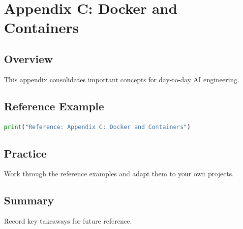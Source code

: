 \chapter{Appendix C: Docker and Containers}
\label{chap:vol12-3}



\section{Overview}
This appendix consolidates important concepts for day-to-day AI engineering.

\section{Reference Example}
\begin{lstlisting}[language=Python]
print("Reference: Appendix C: Docker and Containers")
\end{lstlisting}

\section{Practice}
\begin{exercise}
Work through the reference examples and adapt them to your own projects.
\end{exercise}

\section{Summary}
Record key takeaways for future reference.
